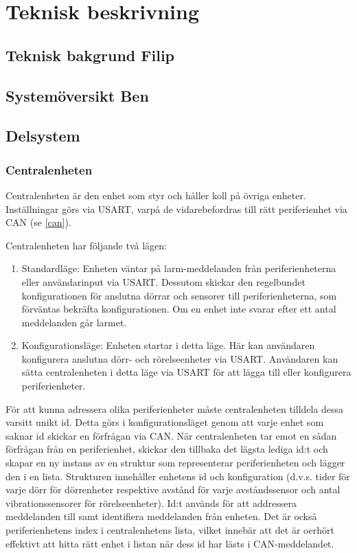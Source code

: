 \documentclass{article}
\begin{document}
\section{Teknisk beskrivning} %
\subsection{Teknisk bakgrund Filip}
\subsection{Systemöversikt Ben}
\subsection{Delsystem }
\subsubsection{Centralenheten}
Centralenheten är den enhet som styr och håller koll på övriga enheter.
 Inställningar görs via USART, varpå de vidarebefordras till rätt
  periferienhet via CAN (se \ref{can}). 

Centralenheten har följande två lägen:

\begin{enumerate}
    \item Standardläge: Enheten väntar på larm-meddelanden från 
    periferienheterna eller användarinput via USART. Dessutom 
    skickar den regelbundet  konfigurationen för anslutna 
    dörrar och sensorer till periferienheterna, som förväntas 
    bekräfta konfigurationen. Om en enhet inte svarar efter 
    ett antal meddelanden går larmet.
    \item Konfigurationsläge: Enheten startar i detta läge.
     Här kan användaren konfigurera anslutna dörr- och 
     rörelseenheter via USART. Användaren kan sätta centralenheten
      i detta läge via USART för att lägga till eller konfigurera
       periferienheter.
\end{enumerate}

För att kunna adressera olika periferienheter måste centralenheten 
tilldela dessa varsitt unikt id. Detta görs i konfigurationsläget
genom att varje enhet som saknar id skickar en förfrågan via CAN.
När centralenheten tar emot en sådan förfrågan från en periferienhet, 
skickar den tillbaka det lägsta lediga id:t och skapar en ny instans
av en struktur som representerar periferienheten och lägger den i en
lista. Strukturen innehåller enhetens id och konfiguration (d.v.s.
tider för varje dörr för dörrenheter respektive avstånd för varje
avståndssensor och antal vibrationssensorer för rörelseenheter). 
Id:t används för att addressera meddelanden till samt identifiera 
meddelanden från enheten. Det är också periferienhetens index i 
centralenhetens lista, vilket innebär att det är oerhört effektivt
att hitta rätt enhet i listan när dess id har lästs i CAN-meddelandet.
\end{document}
